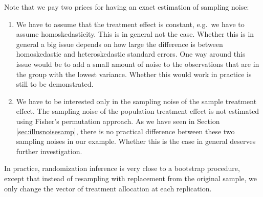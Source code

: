 \documentclass[]{book}
\providecommand{\tightlist}{%
  \setlength{\itemsep}{0pt}\setlength{\parskip}{0pt}}
\theoremstyle{definition}
\theoremstyle{definition}
\theoremstyle{definition}
\theoremstyle{remark}
\let\BeginKnitrBlock\begin \let\EndKnitrBlock\end
\begin{document}
\BeginKnitrBlock{remark}
\iffalse{} {Remark. } \fi{}Note that we pay two prices for having an exact estimation of sampling noise:
\EndKnitrBlock{remark}

\begin{enumerate}
\def\labelenumi{\arabic{enumi}.}
\tightlist
\item
  We have to assume that the treatment effect is constant, e.g.~we have to assume homoskedasticity.
  This is in general not the case.
  Whether this is in general a big issue depends on how large the difference is between homoskedastic and heteroskedastic standard errors.
  One way around this issue would be to add a small amount of noise to the observations that are in the group with the lowest variance.
  Whether this would work in practice is still to be demonstrated.
\item
  We have to be interested only in the sampling noise of the sample treatment effect.
  The sampling noise of the population treatment effect is not estimated using Fisher's permutation approach.
  As we have seen in Section \ref{sec:illusnoisesamp}, there is no practical difference between these two sampling noises in our example.
  Whether this is the case in general deserves further investigation.
\end{enumerate}

\BeginKnitrBlock{example}
\protect\hypertarget{exm:unnamed-chunk-63}{}{\label{exm:unnamed-chunk-63} }In practice, randomization inference is very close to a bootstrap procedure, except that instead of resampling with replacement from the original sample, we only change the vector of treatment allocation at each replication.
\EndKnitrBlock{example}
\end{document}
